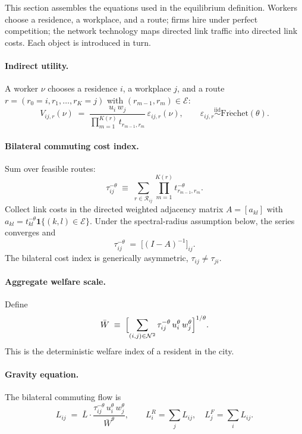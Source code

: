 \documentclass[12pt]{article}
\newcommand{\N}{\mathcal N}
\newcommand{\E}{\mathcal E}
\newcommand{\R}{\mathcal R}
\newcommand{\Lbar}{\bar L}
\newcommand{\Wbar}{\bar W}
\newcommand{\tkl}{t_{kl}}
\newcommand{\tijk}{\tau_{ij}}
\begin{document}
This section assembles the equations used in the equilibrium
definition.  Workers choose a residence, a workplace, and a route;
firms hire under perfect competition; the network technology maps
directed link traffic into directed link costs.  Each object is
introduced in turn.

\paragraph{Indirect utility.}
A worker $\nu$ chooses a residence $i$, a workplace $j$, and a route
$r=(r_0=i,r_1,\dots,r_K=j)$ with $(r_{m-1},r_m)\in\E$:
\begin{equation}
  V_{ij,r}(\nu)
  \;=\;
  \frac{u_i\,w_j}{\prod_{m=1}^{K(r)}t_{r_{m-1},r_m}}\,
  \varepsilon_{ij,r}(\nu),
  \qquad
  \varepsilon_{ij,r}\overset{\mathrm{iid}}{\sim}\mathrm{Fr\acute echet}(\theta).
  \label{eq:utility}
\end{equation}

\paragraph{Bilateral commuting cost index.}
Sum over feasible routes:
\begin{equation}
  \tijk^{-\theta}
  \;\equiv\;
  \sum_{r\in\R_{ij}}\prod_{m=1}^{K(r)}t_{r_{m-1},r_m}^{-\theta}.
  \label{eq:tau_def}
\end{equation}
Collect link costs in the directed weighted adjacency matrix
$A=[a_{kl}]$ with $a_{kl}=\tkl^{-\theta}\mathbf 1\{(k,l)\in\E\}$.
Under the spectral-radius assumption below, the series converges and
\begin{equation}
  \tijk^{-\theta}\;=\;\bigl[(I-A)^{-1}\bigr]_{ij}.
  \label{eq:tau_series}
\end{equation}
The bilateral cost index is generically asymmetric,
$\tijk\ne\tau_{ji}$.

\paragraph{Aggregate welfare scale.}
Define
\begin{equation}
  \Wbar\;\equiv\;
  \Bigl[\sum_{(i,j)\in\N^2}\tijk^{-\theta}\,u_i^{\theta}\,w_j^{\theta}\Bigr]^{1/\theta}.
  \label{eq:Wbar_def}
\end{equation}
This is the deterministic welfare index of a resident in the city.

\paragraph{Gravity equation.}
The bilateral commuting flow is
\begin{equation}
  L_{ij}\;=\;\Lbar\cdot
  \frac{\tijk^{-\theta}\,u_i^{\theta}\,w_j^{\theta}}{\Wbar^{\theta}},
  \qquad
  L_i^R=\sum_j L_{ij},\quad L_j^F=\sum_i L_{ij}.
  \label{eq:gravity}
\end{equation}
\end{document}
